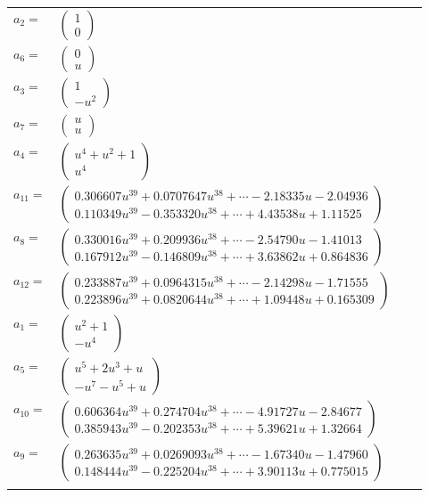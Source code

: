 \documentclass[1p]{elsarticle_modified}
\theoremstyle{definition}
\begin{document}
\begin{tabular}{m{7pt} m{180pt} m{7pt} m{180pt} }
\flushright $a_{2}=$&$\begin{pmatrix}1\\0\end{pmatrix}$ \\
\flushright $a_{6}=$&$\begin{pmatrix}0\\u\end{pmatrix}$ \\
\flushright $a_{3}=$&$\begin{pmatrix}1\\- u^2\end{pmatrix}$ \\
\flushright $a_{7}=$&$\begin{pmatrix}u\\u\end{pmatrix}$ \\
\flushright $a_{4}=$&$\begin{pmatrix}u^4+u^2+1\\u^4\end{pmatrix}$ \\
\flushright $a_{11}=$&$\begin{pmatrix}0.306607 u^{39}+0.0707647 u^{38}+\cdots-2.18335 u-2.04936\\0.110349 u^{39}-0.353320 u^{38}+\cdots+4.43538 u+1.11525\end{pmatrix}$ \\
\flushright $a_{8}=$&$\begin{pmatrix}0.330016 u^{39}+0.209936 u^{38}+\cdots-2.54790 u-1.41013\\0.167912 u^{39}-0.146809 u^{38}+\cdots+3.63862 u+0.864836\end{pmatrix}$ \\
\flushright $a_{12}=$&$\begin{pmatrix}0.233887 u^{39}+0.0964315 u^{38}+\cdots-2.14298 u-1.71555\\0.223896 u^{39}+0.0820644 u^{38}+\cdots+1.09448 u+0.165309\end{pmatrix}$ \\
\flushright $a_{1}=$&$\begin{pmatrix}u^2+1\\- u^4\end{pmatrix}$ \\
\flushright $a_{5}=$&$\begin{pmatrix}u^5+2 u^3+u\\- u^7- u^5+u\end{pmatrix}$ \\
\flushright $a_{10}=$&$\begin{pmatrix}0.606364 u^{39}+0.274704 u^{38}+\cdots-4.91727 u-2.84677\\0.385943 u^{39}-0.202353 u^{38}+\cdots+5.39621 u+1.32664\end{pmatrix}$ \\
\flushright $a_{9}=$&$\begin{pmatrix}0.263635 u^{39}+0.0269093 u^{38}+\cdots-1.67340 u-1.47960\\0.148444 u^{39}-0.225204 u^{38}+\cdots+3.90113 u+0.775015\end{pmatrix}$\\&\end{tabular}
\end{document}
